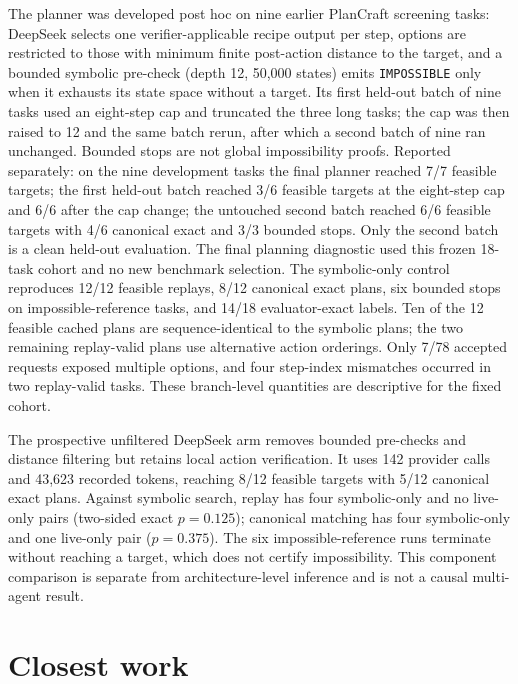 The planner was developed post hoc on nine earlier PlanCraft screening tasks: DeepSeek selects one verifier-applicable recipe output per step, options are restricted to those with minimum finite post-action distance to the target, and a bounded symbolic pre-check (depth 12, 50,000 states) emits \texttt{IMPOSSIBLE} only when it exhausts its state space without a target. Its first held-out batch of nine tasks used an eight-step cap and truncated the three long tasks; the cap was then raised to 12 and the same batch rerun, after which a second batch of nine ran unchanged. Bounded stops are not global impossibility proofs. Reported separately: on the nine development tasks the final planner reached 7/7 feasible targets; the first held-out batch reached 3/6 feasible targets at the eight-step cap and 6/6 after the cap change; the untouched second batch reached 6/6 feasible targets with 4/6 canonical exact and 3/3 bounded stops. Only the second batch is a clean held-out evaluation. The final planning diagnostic used this frozen 18-task cohort and no new benchmark selection. The symbolic-only control reproduces 12/12 feasible replays, 8/12 canonical exact plans, six bounded stops on impossible-reference tasks, and 14/18 evaluator-exact labels. Ten of the 12 feasible cached plans are sequence-identical to the symbolic plans; the two remaining replay-valid plans use alternative action orderings. Only 7/78 accepted requests exposed multiple options, and four step-index mismatches occurred in two replay-valid tasks. These branch-level quantities are descriptive for the fixed cohort.

The prospective unfiltered DeepSeek arm removes bounded pre-checks and distance filtering but retains local action verification. It uses 142 provider calls and 43,623 recorded tokens, reaching 8/12 feasible targets with 5/12 canonical exact plans. Against symbolic search, replay has four symbolic-only and no live-only pairs (two-sided exact $p=0.125$); canonical matching has four symbolic-only and one live-only pair ($p=0.375$). The six impossible-reference runs terminate without reaching a target, which does not certify impossibility. This component comparison is separate from architecture-level inference and is not a causal multi-agent result.

\section{Closest work}
\label{app:closest}

